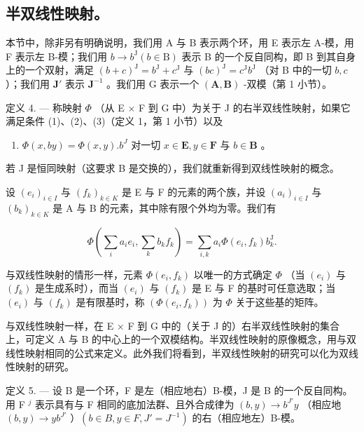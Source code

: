 \subsection{半双线性映射。}

本节中，除非另有明确说明，我们用 A 与 B 表示两个环，用 E 表示左 A-模，用 F 表示左 B-模；我们用 \(b \to b^{\mathrm{J}} (b \in \mathrm{B})\) 表示 B 的一个反自同构，即 B 到其自身上的一个双射，满足 \((b + c)^{\mathrm{J}} = b^{\mathrm{J}} + c^{\mathrm{J}}\) 与 \((bc)^{\mathrm{J}} = c^{\mathrm{J}}b^{\mathrm{J}}\) （对 B 中的一切 \(b, c\)）；我们用 \(\mathbf{J}'\) 表示 \(\mathbf{J}^{-1}\) 。我们用 G 表示一个 \((\mathbf{A}, \mathbf{B})\) -双模（第 1 小节）。

定义 4. --- 称映射 \(\Phi\) （从 E \(\times\) F 到 G 中）为关于 J 的右半双线性映射，如果它满足条件 (1)、(2)、(3)（定义 1，第 1 小节）以及

\begin{enumerate}
\def\labelenumi{(\arabic{enumi})}
\setcounter{enumi}{6}
\tightlist
\item
  \(\Phi(x, by) = \Phi(x, y). b^J\) 对一切 \(x \in \mathbf{E}, y \in \mathbf{F}\) 与 \(b \in \mathbf{B}\) 。
\end{enumerate}

若 J 是恒同映射（这要求 B 是交换的），我们就重新得到双线性映射的概念。

设 \((e_i)_{i\in I}\) 与 \((f_k)_{k\in K}\) 是 E 与 F 的元素的两个族，并设 \((a_i)_{i\in I}\) 与 \((b_k)_{k\in K}\) 是 A 与 B 的元素，其中除有限个外均为零。我们有

\[
\Phi (\sum_ {i} a _ {i} e _ {i}, \sum_ {k} b _ {k} f _ {k}) = \sum_ {i, k} a _ {i} \Phi (e _ {i}, f _ {k}) b _ {k} ^ {\mathrm{J}}.\tag{8}
\]

与双线性映射的情形一样，元素 \(\Phi(e_i, f_k)\) 以唯一的方式确定 \(\Phi\) （当 \((e_i)\) 与 \((f_k)\) 是生成系时），而当 \((e_i)\) 与 \((f_k)\) 是 E 与 F 的基时可任意选取；当 \((e_i)\) 与 \((f_k)\) 是有限基时，称 \((\Phi(e_i, f_k))\) 为 \(\Phi\) 关于这些基的矩阵。

与双线性映射一样，在 E × F 到 G 中的（关于 J 的）右半双线性映射的集合上，可定义 A 与 B 的中心上的一个双模结构。半双线性映射的原像概念，用与双线性映射相同的公式来定义。此外我们将看到，半双线性映射的研究可以化为双线性映射的研究。

定义 5. --- 设 B 是一个环，F 是左（相应地右）B-模，J 是 B 的一个反自同构。用 F \(^{j}\) 表示具有与 F 相同的底加法群、且外合成律为 \((b, y) \to b^{J'}y\) （相应地 \((b, y) \to yb^{J'}\) ）\((b \in B, y \in F, J' = J^{-1})\) 的右（相应地左）B-模。


